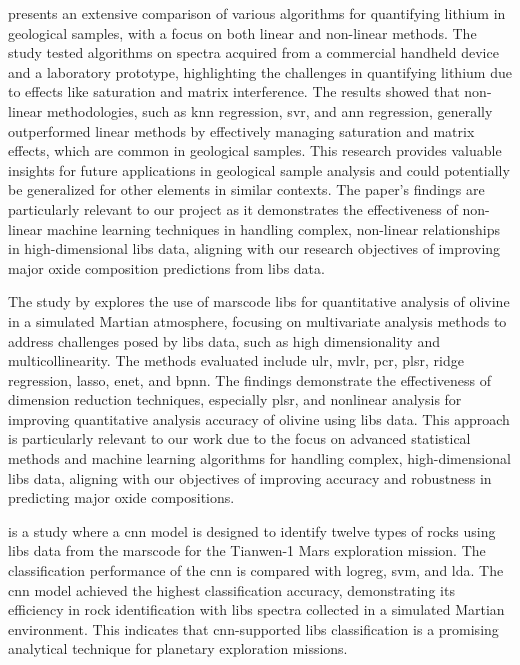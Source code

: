 \citet{ferreiraComprehensiveComparisonLinear2022} presents an extensive comparison of various algorithms for quantifying lithium in geological samples, with a focus on both linear and non-linear methods.
The study tested algorithms on spectra acquired from a commercial handheld device and a laboratory prototype, highlighting the challenges in quantifying lithium due to effects like saturation and matrix interference.
The results showed that non-linear methodologies, such as \gls{knn} regression, \gls{svr}, and \gls{ann} regression, generally outperformed linear methods by effectively managing saturation and matrix effects, which are common in geological samples.
This research provides valuable insights for future applications in geological sample analysis and could potentially be generalized for other elements in similar contexts.
The paper's findings are particularly relevant to our project as it demonstrates the effectiveness of non-linear machine learning techniques in handling complex, non-linear relationships in high-dimensional \gls{libs} data, aligning with our research objectives of improving major oxide composition predictions from \gls{libs} data.

The study by \citet{liuComparisonQuantitativeAnalysis2022} explores the use of \gls{marscode} \gls{libs} for quantitative analysis of olivine in a simulated Martian atmosphere, focusing on multivariate analysis methods to address challenges posed by \gls{libs} data, such as high dimensionality and multicollinearity.
The methods evaluated include \gls{ulr}, \gls{mvlr}, \gls{pcr}, \gls{plsr}, ridge regression, \gls{lasso}, \gls{enet}, and \gls{bpnn}.
The findings demonstrate the effectiveness of dimension reduction techniques, especially \gls{plsr}, and nonlinear analysis for improving quantitative analysis accuracy of olivine using \gls{libs} data.
This approach is particularly relevant to our work due to the focus on advanced statistical methods and machine learning algorithms for handling complex, high-dimensional \gls{libs} data, aligning with our objectives of improving accuracy and robustness in predicting major oxide compositions.

\cite{yangConvolutionalNeuralNetwork2022} is a study where a \gls{cnn} model is designed to identify twelve types of rocks using \gls{libs} data from the \gls{marscode} for the Tianwen-1 Mars exploration mission.
The classification performance of the \gls{cnn} is compared with \gls{logreg}, \gls{svm}, and \gls{lda}.
The \gls{cnn} model achieved the highest classification accuracy, demonstrating its efficiency in rock identification with \gls{libs} spectra collected in a simulated Martian environment.
This indicates that \gls{cnn}-supported \gls{libs} classification is a promising analytical technique for planetary exploration missions.


